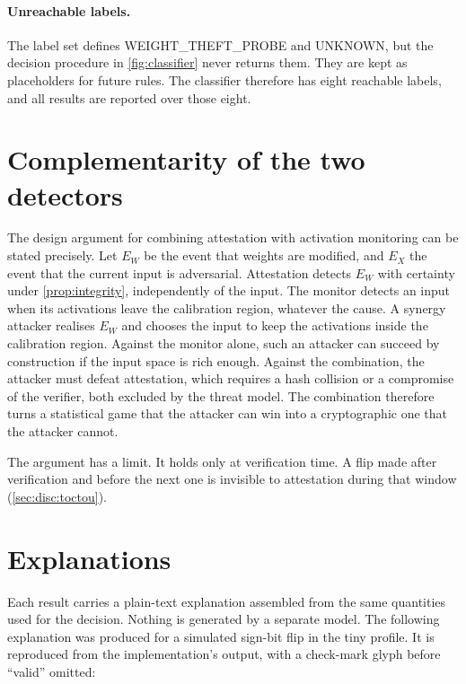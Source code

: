 \paragraph{Unreachable labels.} The label set defines WEIGHT\_THEFT\_PROBE and UNKNOWN, but the
decision procedure in \cref{fig:classifier} never returns them. They are kept as placeholders for
future rules. The classifier therefore has eight reachable labels, and all results are reported
over those eight.

\section{Complementarity of the two detectors}
\label{sec:design:complement}

The design argument for combining attestation with activation monitoring can be stated
precisely. Let $E_W$ be the event that weights are modified, and $E_X$ the event that the
current input is adversarial. Attestation detects $E_W$ with certainty under
\cref{prop:integrity}, independently of the input. The monitor detects an input when its
activations leave the calibration region, whatever the cause. A synergy attacker realises $E_W$
and chooses the input to keep the activations inside the calibration region. Against the monitor
alone, such an attacker can succeed by construction if the input space is rich enough. Against the
combination, the attacker must defeat attestation, which requires a hash collision or a
compromise of the verifier, both excluded by the threat model. The combination therefore turns a
statistical game that the attacker can win into a cryptographic one that the attacker cannot.

The argument has a limit. It holds only at verification time. A flip made after verification
and before the next one is invisible to attestation during that window (\cref{sec:disc:toctou}).

\section{Explanations}
\label{sec:design:explain}

Each result carries a plain-text explanation assembled from the same quantities used for the
decision. Nothing is generated by a separate model. The following explanation was produced for a
simulated sign-bit flip in the tiny profile. It is reproduced from the implementation's output,
with a check-mark glyph before ``valid'' omitted:

